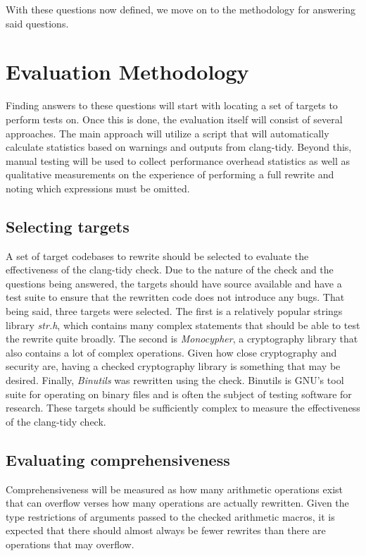 With these questions now defined, we move on to the methodology for answering said questions.

\section{Evaluation Methodology}

Finding answers to these questions will start with locating a set of targets to perform tests on. Once this is done, the evaluation itself will consist of several approaches. The main approach will utilize a script that will automatically calculate statistics based on warnings and outputs from clang-tidy. Beyond this, manual testing will be used to collect performance overhead statistics as well as qualitative measurements on the experience of performing a full rewrite and noting which expressions must be omitted.

\subsection{Selecting targets}

A set of target codebases to rewrite should be selected to evaluate the effectiveness of the clang-tidy check. Due to the nature of the check and the questions being answered, the targets should have source available and have a test suite to ensure that the rewritten code does not introduce any bugs. That being said, three targets were selected. The first is a relatively popular strings library \textit{str.h}, which contains many complex statements that should be able to test the rewrite quite broadly. The second is \textit{Monocypher}, a cryptography library that also contains a lot of complex operations. Given how close cryptography and security are, having a checked cryptography library is something that may be desired. Finally, \textit{Binutils} was rewritten using the check. Binutils is GNU's tool suite for operating on binary files and is often the subject of testing software for research. These targets should be sufficiently complex to measure the effectiveness of the clang-tidy check.

\subsection{Evaluating comprehensiveness}

Comprehensiveness will be measured as how many arithmetic operations exist that can overflow verses how many operations are actually rewritten. Given the type restrictions of arguments passed to the checked arithmetic macros, it is expected that there should almost always be fewer rewrites than there are operations that may overflow.

